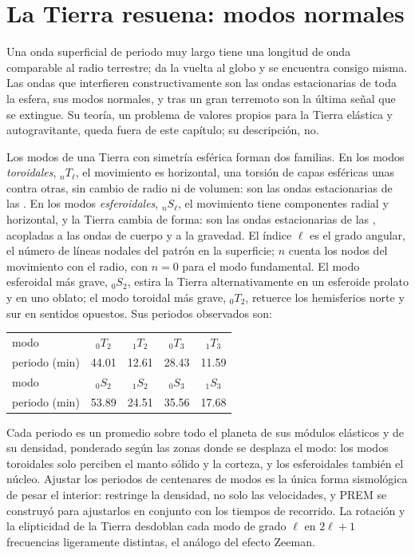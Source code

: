 \section{La Tierra resuena: modos normales}

Una onda superficial de periodo muy largo tiene una longitud de onda comparable al
radio terrestre; da la vuelta al globo y se encuentra consigo misma. Las ondas que
interfieren constructivamente son las ondas estacionarias de toda la esfera, sus
modos normales, y tras un gran terremoto son la última señal que se extingue.
Su teoría, un problema de valores propios para la Tierra elástica y autogravitante,
queda fuera de este capítulo; su descripción, no.

Los modos de una Tierra con simetría esférica forman dos familias. En los modos
\emph{toroidales}, ${}_nT_\ell$, el movimiento es horizontal, una torsión de
capas esféricas unas contra otras, sin cambio de radio ni de volumen: son
las ondas estacionarias de las . En los modos \emph{esferoidales}, 
${}_nS_\ell$, el movimiento tiene componentes radial y horizontal, y la Tierra cambia
de forma: son las ondas estacionarias de las , acopladas a las ondas
de cuerpo y a la gravedad. El índice $\ell$ es el grado angular, el número de líneas
nodales del patrón en la superficie; $n$ cuenta los nodos del movimiento con el radio,
con $n = 0$ para el modo fundamental. El modo esferoidal más grave, ${}_0S_2$, estira
la Tierra alternativamente en un esferoide prolato y en uno oblato; el modo toroidal
más grave, ${}_0T_2$, retuerce los hemisferios norte y sur en sentidos
opuestos. Sus periodos observados son:
\begin{center}
\small
\begin{tabular}{lcccc}
\hline
modo & ${}_0T_2$ & ${}_1T_2$ & ${}_0T_3$ & ${}_1T_3$ \\
periodo (\unit{min}) & 44.01 & 12.61 & 28.43 & 11.59 \\
\hline
modo & ${}_0S_2$ & ${}_1S_2$ & ${}_0S_3$ & ${}_1S_3$ \\
periodo (\unit{min}) & 53.89 & 24.51 & 35.56 & 17.68 \\
\hline
\end{tabular}
\end{center}
Cada periodo es un promedio sobre todo el planeta de sus módulos elásticos y de su
densidad, ponderado según las zonas donde se desplaza el modo: los modos toroidales solo perciben el
manto sólido y la corteza, y los esferoidales también el núcleo. Ajustar los
periodos de centenares de modos es la única forma sismológica de pesar el
interior: restringe la densidad, no solo las velocidades, y PREM se construyó para ajustarlos
en conjunto con los tiempos de recorrido. La rotación y la elipticidad de la Tierra
desdoblan cada modo de grado $\ell$ en $2\ell + 1$ frecuencias ligeramente distintas,
el análogo del efecto Zeeman.


